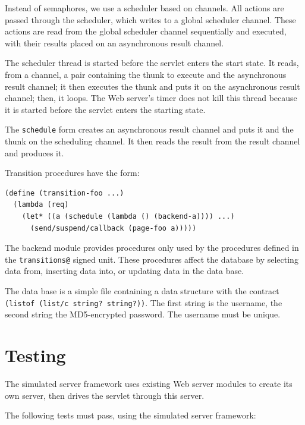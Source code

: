 \documentclass{article}
\begin{document}
Instead of semaphores, we use a scheduler based on channels. All actions are
passed through the scheduler, which writes to a global scheduler channel.
These actions are read from the global scheduler channel sequentially and
executed, with their results placed on an asynchronous result channel.

The scheduler thread is started before the servlet enters the start state. It
reads, from a channel, a pair containing the thunk to execute and the
asynchronous result channel; it then executes the thunk and puts it on the
asynchronous result channel; then, it loops. The Web server's timer does not
kill this thread because it is started before the servlet enters the starting
state. 

The \verb|schedule| form creates an asynchronous result channel and puts it and
the thunk on the scheduling channel. It then reads the result from the result
channel and produces it.

Transition procedures have the form:

\begin{verbatim}
(define (transition-foo ...)
  (lambda (req)
    (let* ((a (schedule (lambda () (backend-a)))) ...)
      (send/suspend/callback (page-foo a)))))
\end{verbatim}

The backend module provides procedures only used by the procedures defined in
the \verb|transitions@| signed unit. These procedures affect the database by
selecting data from, inserting data into, or updating data in the data base.

The data base is a simple file containing a data structure with the contract
\verb|(listof (list/c string? string?))|. The first string is the username, the
second string the MD5-encrypted password. The username must be unique.


\section{Testing}\label{sec:tests}

The simulated server framework uses existing Web server modules to create its
own server, then drives the servlet through this server.


The following tests must pass, using the simulated server framework:
\end{document}

